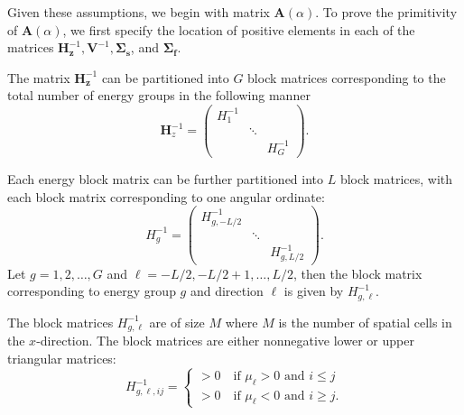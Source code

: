 Given these assumptions, we begin with matrix $\mathbf{A}(\alpha)$. To prove the primitivity of $\mathbf{A}(\alpha)$, we first specify the location of positive elements in each of the matrices $\mathbf{H}_{\mathbf{z}}^{-1}, \mathbf{V}^{-1}, \mathbf{\Sigma_{s}}$, and $\mathbf{\Sigma_{f}}$.

The matrix $\mathbf{H}_\mathbf{z}^{-1}$ can be partitioned into $G$ block matrices corresponding to the total number of energy groups in the following manner
\begin{equation}
	\mathbf{H}_{z}^{-1} = \begin{pmatrix}
						H_{1}^{-1} & & \\
						& \ddots & \\
						& & H_{G}^{-1} 
					\end{pmatrix}.
\end{equation}

Each energy block matrix can be further partitioned into $L$ block matrices, with each block matrix corresponding to one angular ordinate:
\begin{equation}
	H_{g}^{-1} = \begin{pmatrix}
						H_{g,-L/2}^{-1} & & \\
						& \ddots & \\
						& & H_{g,L/2}^{-1} 
					\end{pmatrix}.
\end{equation}
Let $g = 1, 2, \dots, G$ and $\ell = -L/2, -L/2+1, \dots, L/2$, then the block matrix corresponding to energy group $g$ and direction $\ell$ is given by $H^{-1}_{g,\ell}$.

The block matrices $H^{-1}_{g,\ell}$ are of size $M$ where $M$ is the number of spatial cells in the $x$-direction. The block matrices are either nonnegative lower or upper triangular matrices:
\begin{equation}
	H^{-1}_{g,\ell,ij} = \begin{cases}
					> 0 \quad \text{if } \mu_{\ell} > 0 \text{ and } i \leq j \\
					> 0 \quad \text{if } \mu_{\ell} < 0 \text{ and } i \geq j.
				\end{cases}
\end{equation}

